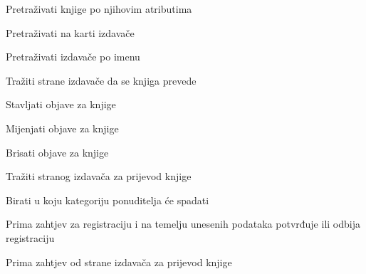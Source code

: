 			
			\begin{packed_enum}
				\item  {}
				
				\begin{packed_enum}
					
					\item Pretraživati knjige po njihovim atributima
					\item Pretraživati na karti izdavače
                    \item Pretraživati izdavače po imenu
                    \item Tražiti strane izdavače da se knjiga prevede
						
				
		
				\end{packed_enum}
			
				\item  {}
				
				\begin{packed_enum}
					
					\item Stavljati objave za knjige
					\item Mijenjati objave za knjige
                    \item Brisati objave za knjige
                    \item Tražiti stranog izdavača za prijevod knjige
                    \item Birati u koju kategoriju ponuditelja će spadati
					
				\end{packed_enum}

                \item {}
                \begin{packed_enum}
                    \item Prima zahtjev za registraciju i na temelju unesenih podataka potvrđuje ili odbija registraciju
                \end{packed_enum}

                \item {}
                \begin{packed_enum}
                    \item Prima zahtjev od strane izdavača za prijevod knjige
                \end{packed_enum}


\end{packed_enum}
